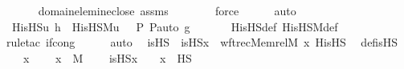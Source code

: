 \begin{isabellebody}
\ \ \ \ \isamarkupfalse%
\ domain{\isacharunderscore}{\kern0pt}elem{\isacharunderscore}{\kern0pt}in{\isacharunderscore}{\kern0pt}eclose\ assms\ \isanewline
\ \ \ \ \ \isamarkupfalse%
\ force\isanewline
\ \ \ \ \isamarkupfalse%
\ auto\ \isanewline
\ \ \isamarkupfalse%
\ \isamarkupfalse%
\ {\isachardoublequoteopen}His{\isacharunderscore}{\kern0pt}HS{\isacharparenleft}{\kern0pt}u{\isacharcomma}{\kern0pt}\ h{\isacharparenright}{\kern0pt}\ {\isacharequal}{\kern0pt}\ His{\isacharunderscore}{\kern0pt}HS{\isacharunderscore}{\kern0pt}M{\isacharparenleft}{\kern0pt}{\isasymlangle}u{\isacharcomma}{\kern0pt}\ {\isasymF}{\isacharcomma}{\kern0pt}\ {\isasymG}{\isacharcomma}{\kern0pt}\ P{\isacharcomma}{\kern0pt}\ P{\isacharunderscore}{\kern0pt}auto{\isasymrangle}{\isacharcomma}{\kern0pt}\ g{\isacharparenright}{\kern0pt}{\isachardoublequoteclose}\ \isanewline
\ \ \ \ \isamarkupfalse%
\ His{\isacharunderscore}{\kern0pt}HS{\isacharunderscore}{\kern0pt}def\ His{\isacharunderscore}{\kern0pt}HS{\isacharunderscore}{\kern0pt}M{\isacharunderscore}{\kern0pt}def\isanewline
\ \ \ \ \isamarkupfalse%
{\isacharparenleft}{\kern0pt}rule{\isacharunderscore}{\kern0pt}tac\ if{\isacharunderscore}{\kern0pt}cong{\isacharparenright}{\kern0pt}\isanewline
\ \ \ \ \isamarkupfalse%
\ auto\ \isanewline
{}\isamarkupfalse%
%
\endisatagproof
{\isafoldproof}%
%
\isadelimproof
\isanewline
%
\endisadelimproof
\isanewline
{}\isamarkupfalse%
\ is{\isacharunderscore}{\kern0pt}HS\ \ {\isachardoublequoteopen}is{\isacharunderscore}{\kern0pt}HS{\isacharparenleft}{\kern0pt}x{\isacharparenright}{\kern0pt}\ {\isasymequiv}\ wftrec{\isacharparenleft}{\kern0pt}Memrel{\isacharparenleft}{\kern0pt}M{\isacharparenright}{\kern0pt}{\isacharcircum}{\kern0pt}{\isacharplus}{\kern0pt}{\isacharcomma}{\kern0pt}\ x{\isacharcomma}{\kern0pt}\ His{\isacharunderscore}{\kern0pt}HS{\isacharparenright}{\kern0pt}{\isachardoublequoteclose}\ \isanewline
\isanewline
{}\isamarkupfalse%
\ def{\isacharunderscore}{\kern0pt}is{\isacharunderscore}{\kern0pt}HS\ {\isacharcolon}{\kern0pt}\ \isanewline
\ \ \ x\ \isanewline
\ \ \ {\isachardoublequoteopen}x\ {\isasymin}\ M{\isachardoublequoteclose}\ \isanewline
\ \ \ {\isachardoublequoteopen}is{\isacharunderscore}{\kern0pt}HS{\isacharparenleft}{\kern0pt}x{\isacharparenright}{\kern0pt}\ {\isacharequal}{\kern0pt}\ {}\ {\isasymlongleftrightarrow}\ x\ {\isasymin}\ HS{\isachardoublequoteclose}\ \isanewline

\end{isabellebody}
